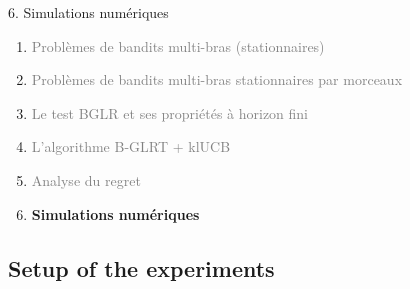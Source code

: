 \documentclass[11pt,french,ignorenonframetext,]{beamer}
\begin{document}
\begin{frame}{6. Simulations numériques}

  \begin{enumerate}
    \item
    \textcolor{gray}{
      Problèmes de bandits multi-bras (stationnaires)
    }
    \vspace*{15pt}

    \item
    \textcolor{gray}{
      Problèmes de bandits multi-bras stationnaires par morceaux
    }
    \vspace*{15pt}

    \item
    \textcolor{gray}{
      Le test BGLR et ses propriétés à horizon fini
    }
    \vspace*{15pt}

    \item
    \textcolor{gray}{
      L'algorithme B-GLRT + klUCB
    }
    \vspace*{15pt}

    \item
    \textcolor{gray}{
      Analyse du regret
    }
    \vspace*{15pt}

    \item
    \alert{\textbf{%
      Simulations numériques
    }}
  \end{enumerate}

\end{frame}


\subsection{\hfill{}Setup of the experiments\hfill{}}
\end{document}
